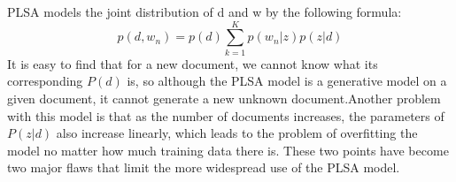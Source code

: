 PLSA models the joint distribution of d and w by the following formula:
\[
  p(d,w_n) = p(d)\sum_{k=1}^{K}p(w_n|z)p(z|d)
\]
It is easy to find that for a new document, we cannot know what its corresponding $P(d)$ is, so although the PLSA model is a generative model on a given document, it cannot generate a new unknown document.Another problem with this model is that as the number of documents increases, the parameters of $P(z|d)$ also increase linearly, which leads to the problem of overfitting the model no matter how much training data there is. These two points have become two major flaws that limit the more widespread use of the PLSA model.
